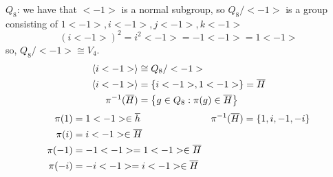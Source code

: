 $Q_8$: we have that $<-1>$ is a normal subgroup, so $Q_8/<-1>$ is a group consisting of $1<-1>, i<-1>, j<-1>, k<-1>$ 
$$(i<-1>)^2 = i^2<-1> = -1<-1> = 1<-1>$$
so, $Q_8/<-1> \cong V_4$.
\begin{align*}
    \left<i<-1>\right> &\cong Q_8/<-1> \\
    \left<i<-1>\right> &= \left\{i<-1>, 1<-1>\right\} = \overline{H} \\
    \pi^{-1}(\overline{H})&= \left\{g \in Q_8 : \pi(g) \in \overline{H}\right\}
\end{align*}
\begin{align*}
    \pi(1) &= 1<-1> \in \overline{h} &&\pi^{-1}(\overline{H}) = \left\{1, i, -1, -i\right\} \\
    \pi(i) &= i<-1> \in \overline{H} \\
    \pi(-1) &= -1<-1> = 1<-1> \in \overline{H} \\
    \pi(-i) &= -i<-1> = i<-1> \in \overline{H}
\end{align*}